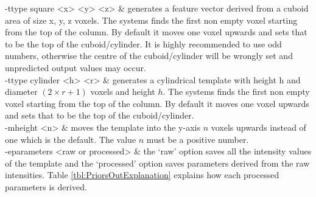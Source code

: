 \documentclass{subfiles}
\begin{document}
\begin{longtable}
				\cmidrule(r){1-1}\cmidrule(l){2-2}
				-ttype  square <x> <y> <z> & generates a feature vector derived from a cuboid area of size x, y, z voxels. The systems finds the first non empty voxel starting from the top of the column. By default it moves one voxel upwards and sets that to be the top of the cuboid/cylinder. It is highly recommended to use odd numbers, otherwise the centre of the cuboid/cylinder will be wrongly set and unpredicted output values may occur. 		\\		
				\cmidrule(r){1-1}\cmidrule(l){2-2}
				-ttype cylinder <h> <r> & generates a cylindrical template with height h and diameter $(2 \times r + 1)$ voxels and height $h$. The systems finds the first non empty voxel starting from the top of the column. By default it moves one voxel upwards and sets that to be the top of the cuboid/cylinder. \\
				\cmidrule(r){1-1}\cmidrule(l){2-2}
				-mheight <n> & moves the template into the y-axis $n$ voxels upwards instead of one which is the default. The value $n$ must be a positive number.\\
				\cmidrule(r){1-1}\cmidrule(l){2-2}
				-eparameters <raw or processed> & the ‘raw’ option saves all the intensity values of the template and the ‘processed’ option saves parameters derived from the raw intensities. Table \ref{tbl:PriorsOutExplanation} explains how each processed parameters is derived. \\
				\bottomrule
				\caption[DASOS's functionalities]{Explanation on how to Modify the Parameters of the 3rd Main Output of DASOS}
				\label{tbl:PriorsParameters}	
			\end{longtable}
			
\end{document}
